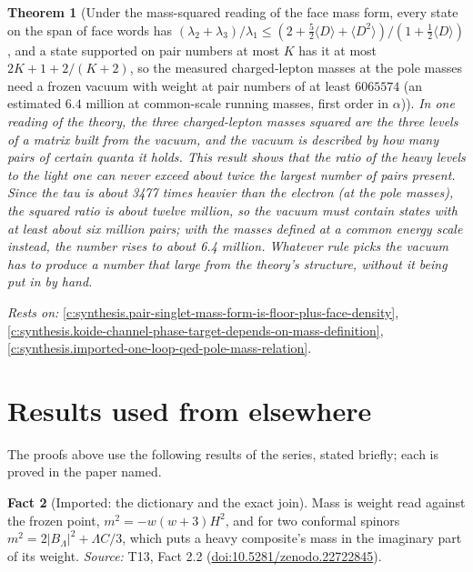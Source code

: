 \documentclass[11pt]{article}
\newtheorem{theorem}{Theorem}[section]
\theoremstyle{definition}
\newtheorem{fact}[theorem]{Fact}
\theoremstyle{plain}
\begin{document}
\begin{theorem}[Under the mass-squared reading of the face mass form, every state on the span of face words has $(\lambda_{2} + \lambda_{3})/\lambda_{1} \le (2 + \tfrac52\langle D\rangle + \langle D^{2}\rangle)/(1 + \tfrac12\langle D\rangle)$, and a state supported on pair numbers at most $K$ has it at most $2K + 1 + 2/(K + 2)$, so the measured charged-lepton masses at the pole masses need a frozen vacuum with weight at pair numbers of at least $6065574$ (an estimated $6.4$ million at common-scale running masses, first order in $\alpha$)]\label{c:synthesis.mass-squared-reading-needs-millions-of-face-pairs}
In one reading of the theory, the three charged-lepton masses squared are the three levels of a matrix built from the vacuum, and the vacuum is described by how many pairs of certain quanta it holds. This result shows that the ratio of the heavy levels to the light one can never exceed about twice the largest number of pairs present. Since the tau is about 3477 times heavier than the electron (at the pole masses), the squared ratio is about twelve million, so the vacuum must contain states with at least about six million pairs; with the masses defined at a common energy scale instead, the number rises to about 6.4 million. Whatever rule picks the vacuum has to produce a number that large from the theory's structure, without it being put in by hand.
\end{theorem}
\noindent\emph{Rests on:} \ref{c:synthesis.pair-singlet-mass-form-is-floor-plus-face-density}, \ref{c:synthesis.koide-channel-phase-target-depends-on-mass-definition}, \ref{c:synthesis.imported-one-loop-qed-pole-mass-relation}.

\section{Results used from elsewhere}
The proofs above use the following results of the series, stated briefly; each is proved in the paper named.

\begin{fact}[Imported: the dictionary and the exact join]\label{c:families.imported-dictionary-exact-join}
Mass is weight read against the frozen point, $m^{2} = -w(w+3)H^{2}$, and for two conformal spinors $m^{2} = 2|B_{\Lambda}|^{2} + \Lambda C/3$, which puts a heavy composite's mass in the imaginary part of its weight.
\emph{Source:} T13, Fact 2.2 (\href{https://doi.org/10.5281/zenodo.22722845}{doi:10.5281/zenodo.22722845}).
\end{fact}
\end{document}
